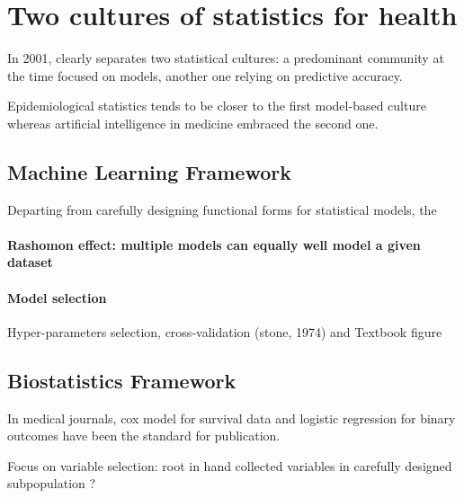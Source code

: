 \documentclass{report}
\begin{document}
\section{Two cultures of statistics for health}\label{sec:intro:two_cultures}

In 2001, \cite{breiman2001statistical} clearly separates two statistical
cultures: a predominant community at the time focused on models, another one
relying on predictive accuracy.

Epidemiological statistics tends to be closer to the first model-based culture
whereas artificial intelligence in medicine embraced the second one.

\begin{baground_box_left}
  \subsection{Machine Learning Framework}\label{subsec:intro:machine_learning}

  Departing from  carefully designing functional forms for statistical models, the
  \paragraph{Rashomon effect: multiple models can equally well model a given dataset}
  \paragraph{Model selection}
  Hyper-parameters selection, cross-validation (stone, 1974) and Textbook figure

  \subsection{Biostatistics Framework}\label{subsec:intro:biostatistics_framework}

  In medical journals, cox model for survival data and logistic regression for
  binary outcomes have been the standard for publication.

  Focus on variable selection: root in hand collected variables in carefully designed subpopulation ?


\end{baground_box_left}
\end{document}
